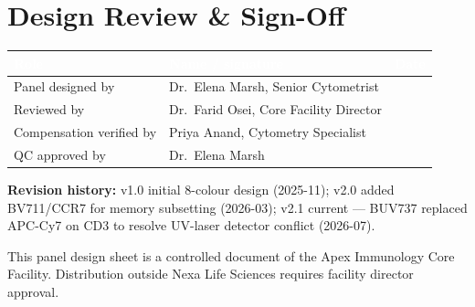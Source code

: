 \section{Design Review \& Sign-Off}
\label{sec:signoff}

\begin{center}
\renewcommand{\arraystretch}{1.35}
\begin{tabularx}{\linewidth}{@{}L{3.2cm}X C{2.6cm}@{}}
\toprule
{}
\textcolor{white}{\textbf{Role}} & \textcolor{white}{\textbf{Name / signature}} & \textcolor{white}{\textbf{Date}} \\
\midrule
Panel designed by & Dr.~Elena Marsh, Senior Cytometrist & \\
Reviewed by & Dr.~Farid Osei, Core Facility Director & \\
Compensation verified by & Priya Anand, Cytometry Specialist & \\
QC approved by & Dr.~Elena Marsh & \\
\bottomrule
\end{tabularx}
\end{center}

\vspace{8pt}
\noindent\textbf{Revision history:} v1.0 initial 8-colour design (2025-11);
v2.0 added BV711/CCR7 for memory subsetting (2026-03); v2.1 current ---
BUV737 replaced APC-Cy7 on CD3 to resolve UV-laser detector conflict
(2026-07).

\vspace{10pt}
\begin{center}
\footnotesize\color{FlowNavy!70!black}
This panel design sheet is a controlled document of the Apex Immunology
Core Facility. Distribution outside Nexa Life Sciences requires facility
director approval.
\end{center}
